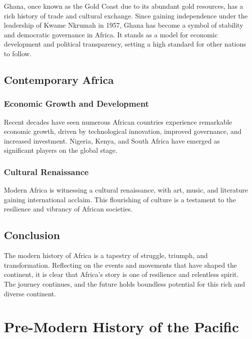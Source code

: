 \documentclass[a4paper,12pt]{book}
\begin{document}
Ghana, once known as the Gold Coast due to its abundant gold resources, has a rich history of trade and cultural exchange. Since gaining independence under the leadership of Kwame Nkrumah in 1957, Ghana has become a symbol of stability and democratic governance in Africa. It stands as a model for economic development and political transparency, setting a high standard for other nations to follow.

\section{Contemporary Africa}
\label{sec:contemporary-africa}

\subsection{Economic Growth and Development}
\label{subsec:economic-growth-and-development}

Recent decades have seen numerous African countries experience remarkable economic growth, driven by technological innovation, improved governance, and increased investment. Nigeria, Kenya, and South Africa have emerged as significant players on the global stage.

\subsection{Cultural Renaissance}
\label{subsec:cultural-renaissance}

Modern Africa is witnessing a cultural renaissance, with art, music, and literature gaining international acclaim. This flourishing of culture is a testament to the resilience and vibrancy of African societies.

\section{Conclusion}
\label{sec:conclusion-modern-africa}

The modern history of Africa is a tapestry of struggle, triumph, and transformation. Reflecting on the events and movements that have shaped the continent, it is clear that Africa’s story is one of resilience and relentless spirit. The journey continues, and the future holds boundless potential for this rich and diverse continent.

\chapter{Pre-Modern History of the Pacific}
\label{ch:pre-modern-pacific-history}
\end{document}
